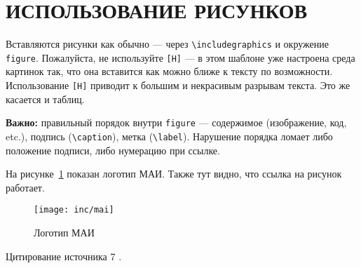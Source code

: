 \section{ИСПОЛЬЗОВАНИЕ РИСУНКОВ}

Вставляются рисунки как обычно --- через 
\texttt{\textbackslash includegraphics} и окружение 
\texttt{figure}. 
Пожалуйста, не используйте \texttt{[H]} --- 
в этом шаблоне уже настроена среда картинок так, 
что она вставится как можно ближе к тексту по возможности. 
Использование \texttt{[H]} приводит к большим и некрасивым 
разрывам текста. Это же касается и таблиц.

\textbf{Важно:} правильный порядок внутри \texttt{figure} --- содержимое (изображение, код, etc.), подпись (\texttt{\textbackslash caption}), метка (\texttt{\textbackslash label}). Нарушение порядка ломает либо положение подписи, либо нумерацию при ссылке.

На рисунке~\ref{fig:fig01} показан логотип МАИ. 
Также тут видно, что ссылка на рисунок работает.
\begin{figure}
  \texttt{[image: inc/mai]}
  \caption{Логотип МАИ}
  \label{fig:fig01}
\end{figure}


\lipsum[3]

Цитирование источника 7 \cite{Wikipedia7}.
